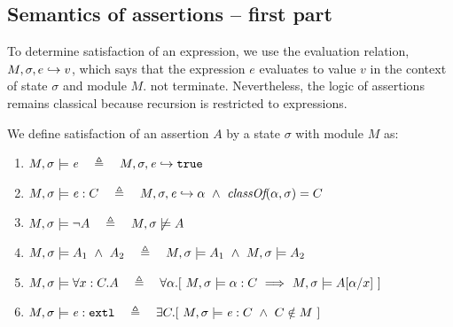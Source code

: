 \subsection{Semantics of assertions %
-- first part}
\label{sect:semantics:assert:standard}

To determine satisfaction of an expression, we    use the evaluation relation, $M, \sigma, e \hookrightarrow v$,
which says that the expression $e$ evaluates
to value $v$ in the context of state $\sigma$ and module $M$.
{}
 not  terminate. Nevertheless, the logic of  assertions %
 remains classical because recursion is restricted to expressions. %


\begin{definition} 
\label{def:chainmail-semantics}
We define satisfaction of an assertion $A$ by a %
state $\sigma$ with 
 module $M$ as:
\begin{enumerate}
\item
\label{cExpr}
$\satisfiesA{M}{\sigma}{{\re}}\ \ \ \triangleq \ \ \   \eval{M}{\sigma}{{\re}}{\true}$
\item
\label{cClass}
$M , \sigma \models {{\mathit{e}}} : C\ \ \ \triangleq \ \ \   M, \sigma, {\mathit{e}} \hookrightarrow \alpha\   \wedge \ \textit{classOf}(\alpha, \sigma)= C$
\item
$\satisfiesA{M}{\sigma}{\neg A}\ \ \ \triangleq \ \ \   {M},{\sigma}\not\models{A}$
\item
$\satisfiesA{M}{\sigma}{A_1\ \wedge\ A_2}\ \ \ \triangleq \ \ \   \satisfiesA{M}{\sigma}{A_1} \   \wedge \ \satisfiesA{M}{\sigma}{A_2}$
\item
\label{quant1}
$\satisfiesA{M}{\sigma}{\all{x:C}{A}} \ \ \ \triangleq \ \ \   
\forall \alpha.[\   \satisfiesA {M}{\sigma} {\alpha:C}  \ \Longrightarrow   \ \satisfiesA{M}{\sigma} {A[\alpha/x]} \ ] $

\item
\label{cExternal}
$\satisfiesA{M}{\sigma}{\external{{\re}}} \ \ \ \triangleq \ \ \  \exists C.[\ \satisfiesA{M}{\sigma}{{{\re}} : C} \ \wedge \ C \notin M \ ]$
\end{enumerate}
\end{definition}

